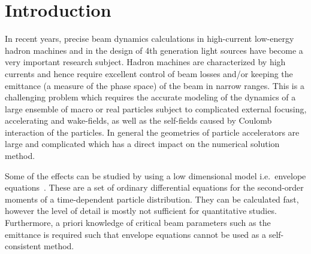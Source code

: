 \section{Introduction}
\label{sec:intro}

In recent years, precise beam dynamics calculations in high-current
low-energy hadron machines and in the design of 4th generation light
sources have become a very important research subject.  Hadron machines
are characterized by high currents and hence require excellent control
of beam losses and/or keeping the emittance (a measure of the phase
space) of the beam in narrow ranges.  This is a challenging problem
which requires the accurate modeling of the dynamics of a large ensemble
of macro or real particles subject to complicated external focusing,
accelerating and wake-fields, as well as the self-fields caused by
Coulomb interaction of the particles.  In general the geometries of
particle accelerators are large and complicated which has a direct
impact on the numerical solution method.

Some of the effects can be studied by using a low dimensional model
i.e.\ envelope equations~\cite{Sacherer68, Sa71, stru-reis:1984,
  gluckstern1}.  These are a set of ordinary differential equations for
the second-order moments of a time-dependent particle distribution.
They can be calculated fast, however the level of detail is mostly not
sufficient for quantitative studies.  Furthermore, a priori knowledge of
critical beam parameters such as the emittance is required such that
envelope equations cannot be used as a self-consistent method.

